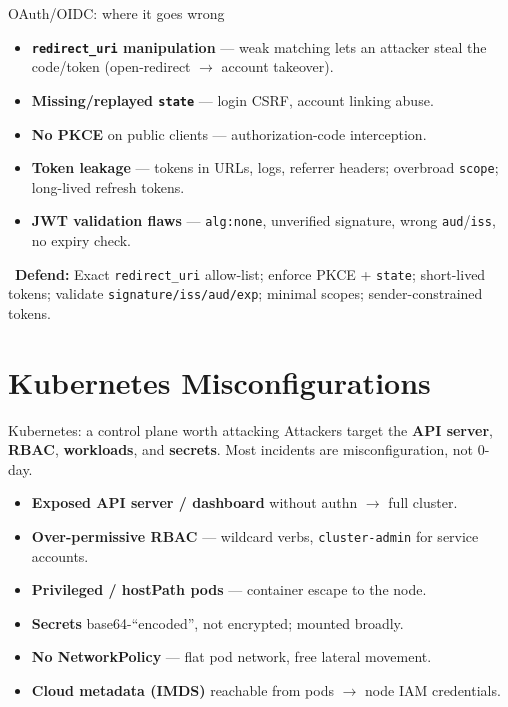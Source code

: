 \documentclass[aspectratio=169,11pt]{beamer}
\newcommand{\defend}[1]{\textcolor{okGreen}{\faLock\ \textbf{Defend:} #1}}
\begin{document}
\begin{frame}{OAuth/OIDC: where it goes wrong}
  \begin{itemize}
    \item \textbf{\texttt{redirect\_uri} manipulation} --- weak matching lets an
          attacker steal the code/token (open-redirect $\to$ account takeover).
    \item \textbf{Missing/replayed \texttt{state}} --- login CSRF, account
          linking abuse.
    \item \textbf{No PKCE} on public clients --- authorization-code interception.
    \item \textbf{Token leakage} --- tokens in URLs, logs, referrer headers;
          overbroad \texttt{scope}; long-lived refresh tokens.
    \item \textbf{JWT validation flaws} --- \texttt{alg:none}, unverified
          signature, wrong \texttt{aud}/\texttt{iss}, no expiry check.
  \end{itemize}
  \defend{Exact \texttt{redirect\_uri} allow-list; enforce PKCE + \texttt{state};
  short-lived tokens; validate \texttt{signature/iss/aud/exp}; minimal scopes;
  sender-constrained tokens.}
\end{frame}

\section{Kubernetes Misconfigurations}
\begin{frame}{Kubernetes: a control plane worth attacking}
  Attackers target the \textbf{API server}, \textbf{RBAC}, \textbf{workloads},
  and \textbf{secrets}. Most incidents are misconfiguration, not 0-day.
  \begin{itemize}\footnotesize
    \item \textbf{Exposed API server / dashboard} without authn $\to$ full
          cluster.
    \item \textbf{Over-permissive RBAC} --- wildcard verbs,
          \texttt{cluster-admin} for service accounts.
    \item \textbf{Privileged / hostPath pods} --- container escape to the node.
    \item \textbf{Secrets} base64-``encoded'', not encrypted; mounted broadly.
    \item \textbf{No NetworkPolicy} --- flat pod network, free lateral movement.
    \item \textbf{Cloud metadata (IMDS)} reachable from pods $\to$ node IAM
          credentials.
  \end{itemize}
\end{frame}
\end{document}
